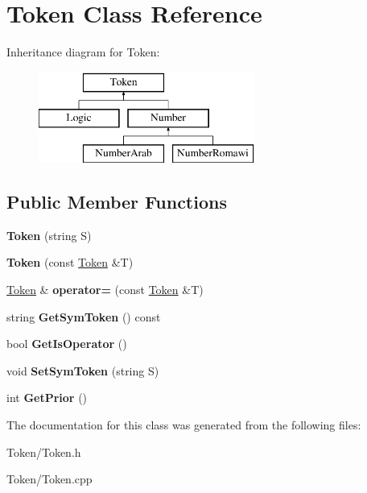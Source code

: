 \hypertarget{class_token}{}\section{Token Class Reference}
\label{class_token}
Inheritance diagram for Token\+:\begin{figure}[H]
\begin{center}
\leavevmode
\includegraphics[height=3.000000cm]{class_token}
\end{center}
\end{figure}
\subsection*{Public Member Functions}
\begin{DoxyCompactItemize}
\item 
\hypertarget{class_token_a8e24c1543e23f1ace3483af6528878c1}{}{\bfseries Token} (string S)\label{class_token_a8e24c1543e23f1ace3483af6528878c1}

\item 
\hypertarget{class_token_a68f6e732c2ddfabe4a2cd18630c2b262}{}{\bfseries Token} (const \hyperlink{class_token}{Token} \&T)\label{class_token_a68f6e732c2ddfabe4a2cd18630c2b262}

\item 
\hypertarget{class_token_a6cda5d9c6fad121dc0e4701296c2c507}{}\hyperlink{class_token}{Token} \& {\bfseries operator=} (const \hyperlink{class_token}{Token} \&T)\label{class_token_a6cda5d9c6fad121dc0e4701296c2c507}

\item 
\hypertarget{class_token_a6f7a4603b5915a72ed8b1bdfaf37f05e}{}string {\bfseries Get\+Sym\+Token} () const \label{class_token_a6f7a4603b5915a72ed8b1bdfaf37f05e}

\item 
\hypertarget{class_token_abbd1e32847716e3d2542de00d5a6b96d}{}bool {\bfseries Get\+Is\+Operator} ()\label{class_token_abbd1e32847716e3d2542de00d5a6b96d}

\item 
\hypertarget{class_token_a18edd2d93a149d142b5de2033b40e00b}{}void {\bfseries Set\+Sym\+Token} (string S)\label{class_token_a18edd2d93a149d142b5de2033b40e00b}

\item 
\hypertarget{class_token_a27104e684c8d247ce8b547990fe33f9b}{}int {\bfseries Get\+Prior} ()\label{class_token_a27104e684c8d247ce8b547990fe33f9b}

\end{DoxyCompactItemize}


The documentation for this class was generated from the following files\+:\begin{DoxyCompactItemize}
\item 
Token/Token.\+h\item 
Token/Token.\+cpp\end{DoxyCompactItemize}
